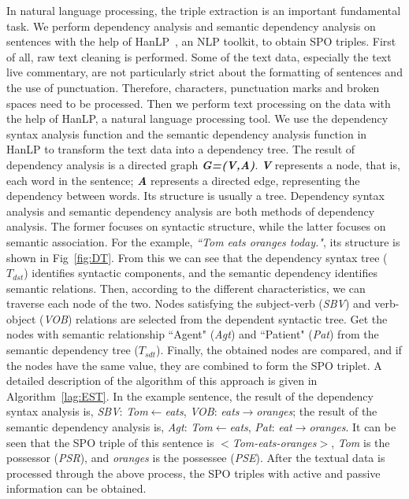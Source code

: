 \documentclass[review,journal]{vgtc}         %
\begin{document}
In natural language processing, the triple extraction is an important fundamental task. We perform dependency analysis and semantic dependency analysis on sentences with the help of HanLP~\cite{noauthor_hanlp_nodate}, an NLP toolkit, to obtain SPO triples. First of all, raw text cleaning is performed. Some of the text data, especially the text live commentary, are not particularly strict about the formatting of sentences and the use of punctuation. Therefore, characters, punctuation marks and broken spaces need to be processed. Then we perform text processing on the data with the help of HanLP, a natural language processing tool. We use the dependency syntax analysis function and the semantic dependency analysis function in HanLP to transform the text data into a dependency tree. The result of dependency analysis is a directed graph \textit{\textbf{G=(V,A)}}. \textit{\textbf{V}} represents a node, that is, each word in the sentence; \textit{\textbf{A}} represents a directed edge, representing the dependency between words. Its structure is usually a tree. Dependency syntax analysis and semantic dependency analysis are both methods of dependency analysis. The former focuses on syntactic structure, while the latter focuses on semantic association. For the example,  \textit{``Tom eats oranges today."}, its structure is shown in Fig~\ref{fig:DT}. From this we can see that the dependency syntax tree ($T_{dst}$) identifies syntactic components, and the semantic dependency identifies semantic relations. Then, according to the different characteristics, we can traverse each node of the two. Nodes satisfying the subject-verb (\textit{SBV}) and verb-object (\textit{VOB}) relations are selected from the dependent syntactic tree. Get the nodes with semantic relationship ``Agent" (\textit{Agt}) and ``Patient" (\textit{Pat}) from the semantic dependency tree ($T_{sdt}$). Finally, the obtained nodes are compared, and if the nodes have the same value, they are combined to form the SPO triplet. A detailed description of the algorithm of this approach is given in Algorithm~\ref{lag:EST}. In the example sentence, the result of the dependency syntax analysis is, \textit{SBV}: \textit{Tom$\gets$eats}, \textit{VOB}: \textit{eats$\to$oranges}; the result of the semantic dependency analysis is, \textit{Agt}: \textit{Tom$\gets$eats}, \textit{Pat}: \textit{eat$\to$oranges}. It can be seen that the SPO triple of this sentence is $<$\textit{Tom-eats-oranges}$>$, \textit{Tom} is the possessor (\textit{PSR}), and \textit{oranges} is the possessee (\textit{PSE}). After the textual data is processed through the above process, the SPO triples with active and passive information can be obtained.
\end{document}
